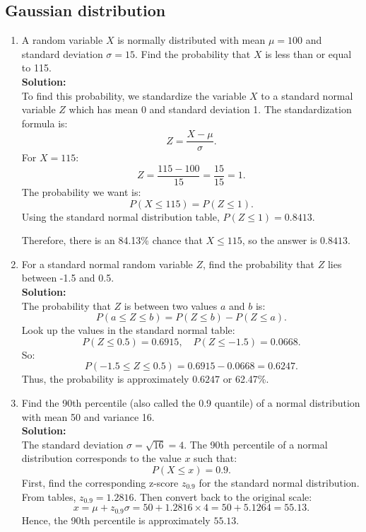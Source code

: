 \documentclass{book}
\begin{document}
\subsection*{Gaussian distribution}

\begin{enumerate}

    \item A random variable \(X\) is normally distributed with mean \(\mu = 100\) and standard deviation \(\sigma = 15\). Find the probability that \(X\) is less than or equal to 115. \\
    
    \textbf{Solution:} \\
    
    To find this probability, we standardize the variable \(X\) to a standard normal variable \(Z\) which has mean 0 and standard deviation 1. The standardization formula is:
    \[
    Z = \frac{X - \mu}{\sigma}.
    \]
    For \(X = 115\):
    \[
    Z = \frac{115 - 100}{15} = \frac{15}{15} = 1.
    \]
    The probability we want is:
    \[
    P(X \leq 115) = P(Z \leq 1).
    \]
    Using the standard normal distribution table, \(P(Z \leq 1) = 0.8413\).
    
    Therefore, there is an 84.13\% chance that \(X \leq 115\), so the answer is \(\boxed{0.8413}\).

    \item For a standard normal random variable \(Z\), find the probability that \(Z\) lies between -1.5 and 0.5. \\
    
    \textbf{Solution:} \\
    
    The probability that \(Z\) is between two values \(a\) and \(b\) is:
    \[
    P(a \leq Z \leq b) = P(Z \leq b) - P(Z \leq a).
    \]
    Look up the values in the standard normal table:
    \[
    P(Z \leq 0.5) = 0.6915, \quad P(Z \leq -1.5) = 0.0668.
    \]
    So:
    \[
    P(-1.5 \leq Z \leq 0.5) = 0.6915 - 0.0668 = 0.6247.
    \]
    Thus, the probability is approximately \(\boxed{0.6247}\) or 62.47\%.

    \item Find the 90th percentile (also called the 0.9 quantile) of a normal distribution with mean 50 and variance 16. \\
    
    \textbf{Solution:} \\
    
    The standard deviation \(\sigma = \sqrt{16} = 4\). The 90th percentile of a normal distribution corresponds to the value \(x\) such that:
    \[
    P(X \leq x) = 0.9.
    \]
    First, find the corresponding z-score \(z_{0.9}\) for the standard normal distribution. From tables, \(z_{0.9} = 1.2816\).
    Then convert back to the original scale:
    \[
    x = \mu + z_{0.9} \sigma = 50 + 1.2816 \times 4 = 50 + 5.1264 = 55.13.
    \]
    Hence, the 90th percentile is approximately \(\boxed{55.13}\).
    
\end{enumerate}
\end{document}
